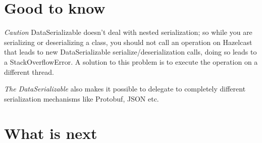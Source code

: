 \section{Good to know}

\emph{Caution} DataSerializable doesn't deal with nested serialization; so while you are serializing or deserializing a class, you should not call an operation on Hazelcast that leads to new DataSerializable serialize/deserialization calls,  doing so leads to a StackOverflowError. A solution to this problem is to execute the operation on a different thread. 

\emph{The DataSerializable} also makes it possible to delegate to completely different serialization mechanisms like Protobuf, JSON etc.

\section{What is next}
